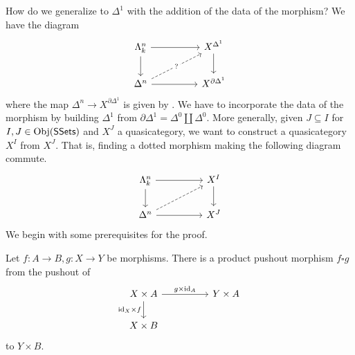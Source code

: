 How do we generalize  to $\Delta^{1}$ with the addition of the data of the morphism? We have the diagram 
$$%
\begin{tikzcd}
	{\Lambda^{n}_{k}} && {X^{\Delta^{1}}} \\
	{\Delta^{n}} && {X^{\partial\Delta^{1}}}
	\arrow[from=1-1, to=1-3]
	\arrow[from=2-1, to=2-3]
	\arrow[from=1-3, to=2-3]
	\arrow[from=1-1, to=2-1]
	\arrow["{?}"{description}, dashed, from=2-1, to=1-3]
\end{tikzcd}$$
where the map $\Delta^{n}\to X^{\partial\Delta^{1}}$ is given by . We have to incorporate the data of the morphism by building $\Delta^{1}$ from $\partial\Delta^{1}=\Delta^{0}\coprod\Delta^{0}$. More generally, given $J\subseteq I$ for $I,J\in\mathrm{Obj}(\mathsf{SSets})$ and $X^{J}$ a quasicategory, we want to construct a quasicategory $X^{I}$ from $X^{J}$. That is, finding a dotted morphism making the following diagram commute. 
$$%
\begin{tikzcd}
	{\Lambda^{n}_{k}} && {X^{I}} \\
	{\Delta^{n}} && {X^{J}}
	\arrow[from=1-1, to=1-3]
	\arrow[from=2-1, to=2-3]
	\arrow[from=1-3, to=2-3]
	\arrow[from=1-1, to=2-1]
	\arrow[dashed, from=2-1, to=1-3]
\end{tikzcd}$$
We begin with some prerequisites for the proof.  
\begin{definition}\label{def: product pushout map}
  Let $f:A\to B, g:X\to Y$ be morphisms. There is a product pushout morphism $f\square g$ from the pushout of 
  $$%
  \begin{tikzcd}
    {X\times A} && {Y\times A} \\
    {X\times B}
    \arrow["{\id_{X}\times f}"', from=1-1, to=2-1]
    \arrow["{g\times\id_{A}}", from=1-1, to=1-3]
  \end{tikzcd}$$
  to $Y\times B$. 
\end{definition}
